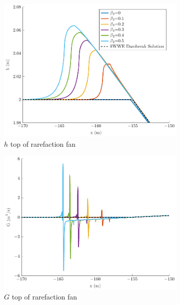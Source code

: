 \documentclass[10pt]{article}
\begin{document}
\begin{figure}
	\centering
	\begin{subfigure}{0.32\textwidth}
		\centering
		\includegraphics[width=\textwidth]{./Figures/Simulations/Study/RegSWWE/Convergence/hRFtop.pdf}
		\caption{$h$ top of rarefaction fan}
	\end{subfigure}
	\begin{subfigure}{0.32\textwidth}
		\centering
		\includegraphics[width=\textwidth]{./Figures/Simulations/Study/RegSWWE/Convergence/GRFtop.pdf}
		\caption{$G$ top of rarefaction fan}
	\end{subfigure}
	\begin{subfigure}{0.32\textwidth}

\end{subfigure}
\end{figure}
\end{document}
